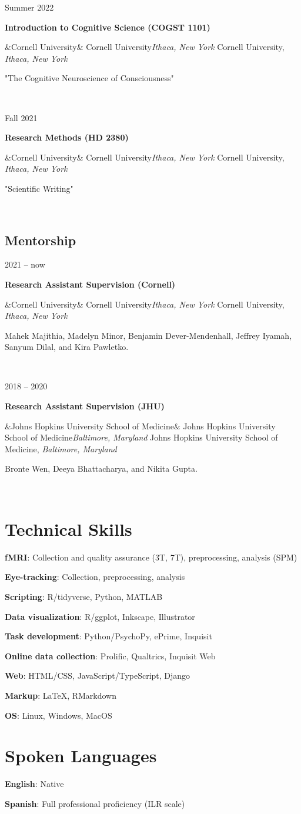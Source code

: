 \documentclass{article}
\newcommand{\entry}[5]{

  \begin{minipage}[t]{.15\textwidth}
    \begin{flushright}
      \hfill {#1}
    \end{flushright}
  \end{minipage}
  \hfill\vline\hfill
  \begin{minipage}[t]{.80\textwidth}
    \textbf{#2}

    \ifx&#3&
      {#3}\textit{#4}
    \else
      {#3, }\textit{#4}

    \fi
    \footnotesize{#5}
  \end{minipage}\\\vspace{.25cm}
}
\newcommand{\skillentry}[2]{
  {\hspace{2em}\textbf{#1}:}
  {#2}
  \vspace{.25cm}
}
\newcommand{\cu}{Cornell University}
\newcommand{\jhusom}{Johns Hopkins University School of Medicine}
\let\oldhref\href
\renewcommand{\href}[3][blue]{\oldhref{#2}{\color{#1}{#3}}}
\begin{document}
\entry{Summer 2022}{Introduction to Cognitive Science (COGST 1101)}
{\cu}{Ithaca, New York}
{"The Cognitive Neuroscience of Consciousness"}

\entry{Fall 2021}{Research Methods (HD 2380)}
{\cu}{Ithaca, New York}
{"Scientific Writing"}

\subsection{Mentorship}

\entry{2021 -- now}{Research Assistant Supervision (Cornell)}
{\cu}{Ithaca, New York}
{Mahek Majithia, Madelyn Minor, Benjamin Dever-Mendenhall, Jeffrey Iyamah, Sanyum Dilal, and Kira Pawletko.}

\entry{2018 -- 2020}{Research Assistant Supervision (JHU)}
{\jhusom}{Baltimore, Maryland}
{Bronte Wen, Deeya Bhattacharya, and Nikita Gupta.}






\section{Technical Skills}

\skillentry{fMRI}
{Collection and quality assurance (3T, 7T), preprocessing, analysis (SPM)}

\skillentry{Eye-tracking}{Collection, preprocessing, analysis}

\skillentry{Scripting}{R/tidyverse, Python, MATLAB}

\skillentry{Data visualization}{R/ggplot, Inkscape, Illustrator}

\skillentry{Task development}
{Python/PsychoPy, ePrime, Inquisit}

\skillentry{Online data collection}
{Prolific, Qualtrics, Inquisit Web}

\skillentry{Web}{HTML/CSS, JavaScript/TypeScript, Django}

\skillentry{Markup}{\LaTeX, RMarkdown}

\skillentry{OS}{Linux, Windows, MacOS}

\section{Spoken Languages}
\skillentry{English}{Native}

\skillentry{Spanish}{Full professional proficiency (ILR scale)}


\raggedleft
\href{https://github.com/opmorgan/cv}{Source code for this CV}
\end{document}

